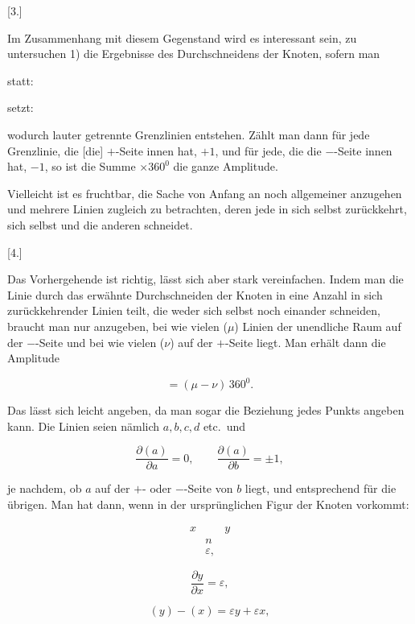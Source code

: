 %
\begin{center}[3.]\end{center}

Im Zusammenhang mit diesem Gegenstand wird es interessant sein, zu
untersuchen 1) die Ergebnisse des Durchschneidens der Knoten, sofern
man

\begin{center}
\begin{minipage}{5.7cm}\centering statt:\quad\end{minipage}
\begin{minipage}{5.7cm}\centering setzt:\quad\end{minipage}
\end{center}
\noindent wodurch lauter getrennte Grenzlinien entstehen. Zählt man dann für
jede Grenzlinie, die [die] $+$-Seite innen hat, $+1$, und für
jede, die die $-$-Seite innen hat, $-1$, so ist die Summe $\times 360^0$
die ganze Amplitude.

Vielleicht ist es fruchtbar, die Sache von Anfang an noch allgemeiner
anzugehen und mehrere Linien zugleich zu betrachten, deren jede in sich
selbst zurückkehrt, sich selbst und die anderen
schneidet.

\begin{center}[4.]\end{center}

Das Vorhergehende ist richtig, lässt sich aber stark vereinfachen. Indem
man die Linie durch das erwähnte Durchschneiden der Knoten in eine Anzahl in
sich zurückkehrender Linien teilt, die weder sich selbst noch einander
schneiden, braucht man nur anzugeben, bei wie vielen ($\mu$) Linien der
unendliche Raum auf der $-$-Seite und bei wie vielen ($\nu$) auf der
$+$-Seite liegt. Man erhält dann die Amplitude

\[
= (\mu-\nu)\,360^0.
\]

Das lässt sich leicht angeben, da man sogar die Beziehung jedes Punkts
angeben kann. Die Linien seien nämlich $a, b, c, d$
etc.\ und

\[
\frac{\partial(a)}{\partial a} = 0, \qquad \frac{\partial(a)}{\partial b} = \pm 1,
\]

je nachdem, ob $a$ auf der $+$- oder $-$-Seite von $b$ liegt, und entsprechend für die
übrigen. Man hat dann, wenn in der ursprünglichen Figur der
Knoten vorkommt:

\[
\begin{array}{ccc}
x&&y \\
&n& \\
&\varepsilon,&
\end{array}
\]

\[
\frac{\partial y}{\partial x} = \varepsilon,
\]

\[
(y) - (x) = \varepsilon y + \varepsilon x,
\]
